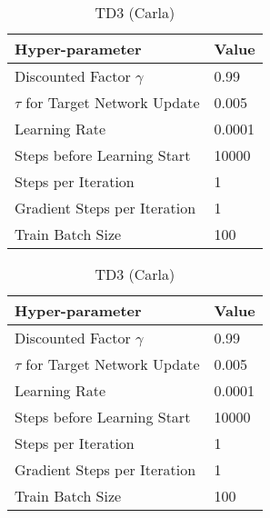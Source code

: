 \begin{table}[H]
\begin{small}
\begin{minipage}{0.45\linewidth}
\centering
\caption{TD3 (MetaDrive)}
\begin{tabular}{@{}ll@{}}
\toprule
Hyper-parameter             & Value  \\ \midrule
Discounted Factor $\gamma$   & 0.99  \\
$\tau$ for Target Network Update & 0.005 \\
Learning Rate              & 0.0001 \\ 
Steps before Learning Start & 10000\\
Steps per Iteration & 1\\
Gradient Steps per Iteration & 1\\
Train Batch Size & 100  \\
\bottomrule
\end{tabular}
\end{minipage}\hfill
\begin{minipage}{0.45\linewidth}
\centering
\caption{TD3 (Carla)}
\begin{tabular}{@{}ll@{}}
\toprule
Hyper-parameter             & Value  \\ \midrule
Discounted Factor $\gamma$   & 0.99  \\
$\tau$ for Target Network Update & 0.005 \\
Learning Rate              & 0.0001 \\ 
Steps before Learning Start & 10000\\
Steps per Iteration & 1\\
Gradient Steps per Iteration & 1\\
Train Batch Size & 100  \\
\bottomrule
\end{tabular}
\end{minipage}
\end{small}
\end{table}

